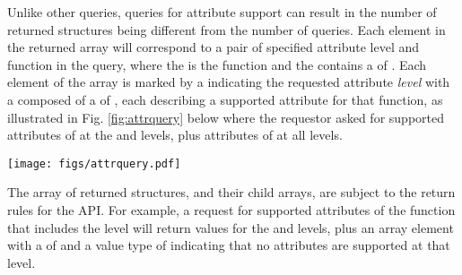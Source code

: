 Unlike other queries, queries for attribute support can result in the number of returned  structures being different from the number of queries. Each element in the returned array will correspond to a pair of specified attribute level and function in the query, where the  is the function and the  contains a  of . Each element of the array is marked by a  indicating the requested attribute \emph{level} with a  composed of a  of , each describing a supported attribute for that function, as illustrated in Fig. \ref{fig:attrquery} below where the requestor asked for supported attributes of  at the  and  levels, plus attributes of  at all levels.

\begingroup
\begin{figure*}[ht!]
  \begin{center}
    \texttt{[image: figs/attrquery.pdf]}
  \end{center}
  \caption{Returned information hierarchy for attribute support request}
  \label{fig:attrquery}
\end{figure*}
\endgroup

The array of returned structures, and their child arrays, are subject to the return rules for the  \ac{API}. For example, a request for supported attributes of the  function that includes the  level will return values for the  and  levels, plus an array element with a  of  and a value type of  indicating that no attributes are supported at that level.

